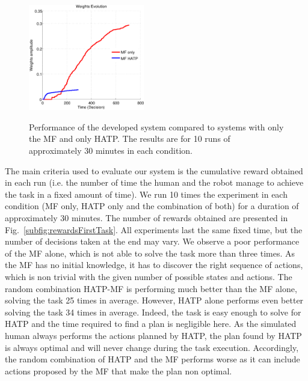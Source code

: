 \documentclass[english,a4paper,11pt,twoside]{StyleThese}
\begin{document}
\begin{figure}[!h]
{        \centering
        \includegraphics[width=0.45\textwidth]{figs/Chapter7/WeightEvolFirstTask.pdf}
       \label{subfig:weightsFirstTask}
   }
    \caption{Performance of the developed system compared to systems with only the MF and only HATP. The results are for 10 runs of approximately 30 minutes in each condition.}
    \label{fig:resultsFirstTask}
\end{figure}

The main criteria used to evaluate our system is the cumulative reward obtained in each run (i.e. the number of time the human and the robot manage to achieve the task in a fixed amount of time). We run 10 times the experiment in each condition (MF only, HATP only and the combination of both) for a duration of approximately 30 minutes. The number of rewards obtained are presented in Fig.~\ref{subfig:rewardsFirstTask}. All experiments last the same fixed time, but the number of decisions taken at the end may vary.  We observe a poor performance of the MF alone, which is not able to solve the task more than three times. As the MF has no initial knowledge, it has to discover the right sequence of actions, which is non trivial with the given number of possible states and actions.
The random combination HATP-MF is performing much better than the MF alone, solving the task 25 times in average. However, HATP alone performs even better solving the task 34 times in average. Indeed, the task is easy enough to solve for HATP and the time required to find a plan is negligible here. As the simulated human always performs the actions planned by HATP, the plan found by HATP is always optimal and will never change during the task execution. Accordingly, the random combination of HATP and the MF performs worse as it can include actions proposed by the MF that make the plan non optimal.
\end{document}
